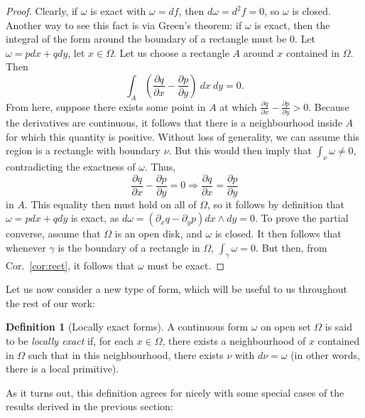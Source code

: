 \documentclass[aps,pra,showpacs,notitlepage,onecolumn,superscriptaddress,nofootinbib]{revtex4-1}
\theoremstyle{definition}
\newtheorem{definition}{Definition}[section]
\begin{document}
\begin{proof}
  Clearly, if $\omega$ is exact with $\omega = df$, then $d \omega = d^2 f = 0$, so $\omega$ is closed. Another way to see this fact is via Green's theorem: if $\omega$ is exact, then
  the integral of the form around the boundary of a rectangle must be $0$. Let $\omega = p dx + q dy$, let $x \in \Omega$. Let us choose a rectangle $A$ around $x$ contained in $\Omega$. Then
  \begin{equation}
    \displaystyle\int_{A} \left( \frac{\partial q}{\partial x} - \frac{\partial p}{\partial y} \right) \ dx \ dy = 0.
  \end{equation}
  From here, suppose there exists some point in $A$ at which $\frac{\partial q}{\partial x} - \frac{\partial p}{\partial y} > 0$. Because the derivatives are continuous, it follows that there is a neighbourhood
  inside $A$ for which this quantity is positive. Without loss of generality, we can assume this region is a rectangle with boundary $\nu$. But this would then imply that $\int_{\nu} \omega \neq 0$, contradicting
  the exactness of $\omega$. Thus,
  \begin{equation}
    \frac{\partial q}{\partial x} - \frac{\partial p}{\partial y} = 0 \Longrightarrow \frac{\partial q}{\partial x} = \frac{\partial p}{\partial y}
  \end{equation}
  in $A$. This equality then must hold on all of $\Omega$, so it follows by definition that $\omega = p dx + q dy$ is exact, as $d \omega = (\partial_x q - \partial_y p) dx \wedge dy = 0$.
  To prove the partial converse, assume that $\Omega$ is an open disk, and $\omega$ is closed. It then follows that whenever $\gamma$ is the boundary of a rectangle in $\Omega$, $\int_{\gamma} \omega = 0$.
  But then, from Cor.~\ref{cor:rect}, it follows that $\omega$ must be exact.
\end{proof}

\noindent Let us now consider a new type of form, which will be useful to us throughout the rest of our work:

\begin{definition}[Locally exact forms]
  A continuous form $\omega$ on open set $\Omega$ is said to be \emph{locally exact} if, for each $x \in \Omega$, there exists a neighbourhood of $x$ contained in $\Omega$ such
  that in this neighbourhood, there exists $\nu$ with $d\nu = \omega$ (in other words, there is a local primitive).
\end{definition}

\noindent As it turns out, this definition agrees for nicely with some special cases of the results derived in the previous section:
\end{document}
